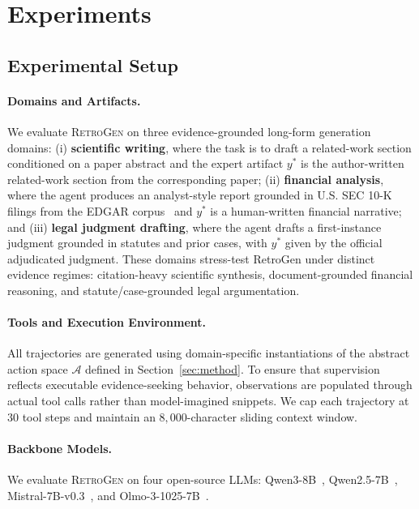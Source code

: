 \section{Experiments}




\subsection{Experimental Setup}
\label{sec:setup}

\paragraph{Domains and Artifacts.}
We evaluate \textsc{RetroGen} on three evidence-grounded long-form generation domains: 
(i) \textbf{scientific writing}, where the task is to draft a related-work section conditioned on a paper abstract and the expert artifact $y^*$ is the author-written related-work section from the corresponding paper;
(ii) \textbf{financial analysis}, where the agent produces an analyst-style report grounded in U.S. SEC 10-K filings from the EDGAR corpus~\citep{loukas2021edgar} and $y^*$ is a human-written financial narrative; and
(iii) \textbf{legal judgment drafting}, where the agent drafts a first-instance judgment grounded in statutes and prior cases, with $y^*$ given by the official adjudicated judgment.
These domains stress-test RetroGen under distinct evidence regimes: citation-heavy scientific synthesis, document-grounded financial reasoning, and statute/case-grounded legal argumentation.

\paragraph{Tools and Execution Environment.}
All trajectories are generated using domain-specific instantiations of the abstract action space $\mathcal{A}$ defined in Section~\ref{sec:method}. To ensure that supervision reflects executable evidence-seeking behavior, observations are populated through actual tool calls rather than model-imagined snippets. We cap each trajectory at $30$ tool steps and maintain an $8{,}000$-character sliding context window.

\paragraph{Backbone Models.}
We evaluate \textsc{RetroGen} on four open-source LLMs: Qwen3-8B~\citep{yang2025qwen3}, Qwen2.5-7B~\citep{Yang2024Qwen25TR}, Mistral-7B-v0.3~\citep{Jiang2023Mistral7}, and Olmo-3-1025-7B~\citep{olmo2025olmo}. 

